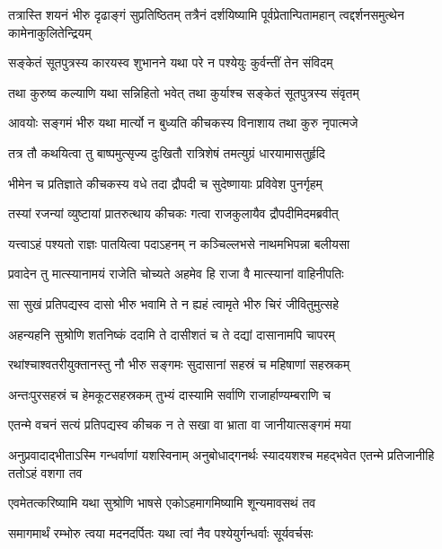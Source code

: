 \threelineshloka
{तत्रास्ति शयनं भीरु दृढाङ्गं सुप्रतिष्ठितम्}
{तत्रैनं दर्शयिष्यामि पूर्वप्रेतान्पितामहान्}
{त्वद्दर्शनसमुत्थेन कामेनाकुलितेन्द्रियम्}


\twolineshloka
{सङ्केतं सूतपुत्रस्य कारयस्व शुभानने}
{यथा परे न पश्येयुः कुर्वन्तीं तेन संविदम्}


\twolineshloka
{तथा कुरुष्व कल्याणि यथा सन्निहितो भवेत्}
{तथा कुर्याश्च सङ्केतं सूतपुत्रस्य संवृतम्}


\twolineshloka
{आवयोः सङ्गमं भीरु यथा मार्त्यो न बुध्यति}
{कीचकस्य विनाशाय तथा कुरु नृपात्मजे}



\twolineshloka
{तत्र तौ कथयित्वा तु बाष्पमुत्सृज्य दुःखितौ}
{रात्रिशेषं तमत्युग्रं धारयामासतुर्हृदि}


\twolineshloka
{भीमेन च प्रतिज्ञाते कीचकस्य वधे तदा}
{द्रौपदी च सुदेष्णायाः प्रविवेश पुनर्गृहम्}


\twolineshloka
{तस्यां रजन्यां व्युष्टायां प्रातरुत्थाय कीचकः}
{गत्वा राजकुलायैव द्रौपदीमिदमब्रवीत्}


\twolineshloka
{यत्त्वाऽहं पश्यतो राज्ञः पातयित्वा पदाऽहनम्}
{न कञ्चिल्लभसे नाथमभिपन्ना बलीयसा}


\twolineshloka
{प्रवादेन तु मात्स्यानामयं राजेति चोच्यते}
{अहमेव हि राजा वै मात्स्यानां वाहिनीपतिः}


\twolineshloka
{सा सुखं प्रतिपद्यस्व दासो भीरु भवामि ते}
{न ह्यहं त्वामृते भीरु चिरं जीवितुमुत्सहे}


\twolineshloka
{अहन्यहनि सुश्रोणि शतनिष्कं ददामि ते}
{दासीशतं च ते दद्यां दासानामपि चापरम्}


\twolineshloka
{रथांश्चाश्वतरीयुक्तानस्तु नौ भीरु सङ्गमः}
{सुदासानां सहस्रं च महिषाणां सहस्रकम्}


\twolineshloka
{अन्तःपुरसहस्रं च हेमकूटसहस्रकम्}
{तुभ्यं दास्यामि सर्वाणि राजार्हाण्यम्बराणि च}




\twolineshloka
{एतन्मे वचनं सत्यं प्रतिपद्यस्व कीचक}
{न ते सखा वा भ्राता वा जानीयात्सङ्गमं मया}


\threelineshloka
{अनुप्रवादाद्भीताऽस्मि गन्धर्वाणां यशस्विनाम्}
{अनुबोधाद्गनर्थः स्यादयशश्च महद्भवेत}
{एतन्मे प्रतिजानीहि ततोऽहं वशगा तव}




\twolineshloka
{एवमेतत्करिष्यामि यथा सुश्रोणि भाषसे}
{एकोऽहमागमिष्यामि शून्यमावसथं तव}


\twolineshloka
{समागमार्थं रम्भोरु त्वया मदनदर्पितः}
{यथा त्वां नैव पश्येयुर्गन्धर्वाः सूर्यवर्चसः}

